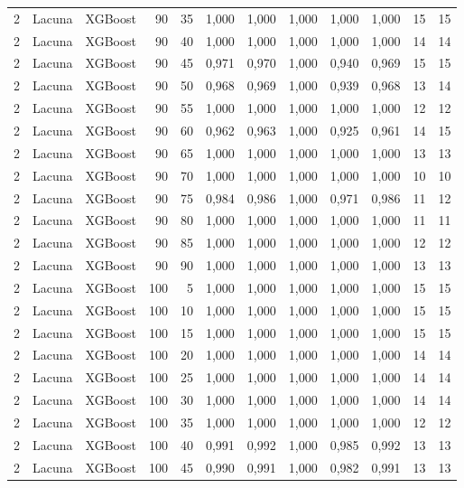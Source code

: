 \begin{longtable}{@{}rllrrrrrrrrr@{}}
2 & Lacuna & XGBoost & 90 & 35 & 1,000 & 1,000 & 1,000 & 1,000 & 1,000 & 15 & 15 \\
2 & Lacuna & XGBoost & 90 & 40 & 1,000 & 1,000 & 1,000 & 1,000 & 1,000 & 14 & 14 \\
2 & Lacuna & XGBoost & 90 & 45 & 0,971 & 0,970 & 1,000 & 0,940 & 0,969 & 15 & 15 \\
2 & Lacuna & XGBoost & 90 & 50 & 0,968 & 0,969 & 1,000 & 0,939 & 0,968 & 13 & 14 \\
2 & Lacuna & XGBoost & 90 & 55 & 1,000 & 1,000 & 1,000 & 1,000 & 1,000 & 12 & 12 \\
2 & Lacuna & XGBoost & 90 & 60 & 0,962 & 0,963 & 1,000 & 0,925 & 0,961 & 14 & 15 \\
2 & Lacuna & XGBoost & 90 & 65 & 1,000 & 1,000 & 1,000 & 1,000 & 1,000 & 13 & 13 \\
2 & Lacuna & XGBoost & 90 & 70 & 1,000 & 1,000 & 1,000 & 1,000 & 1,000 & 10 & 10 \\
2 & Lacuna & XGBoost & 90 & 75 & 0,984 & 0,986 & 1,000 & 0,971 & 0,986 & 11 & 12 \\
2 & Lacuna & XGBoost & 90 & 80 & 1,000 & 1,000 & 1,000 & 1,000 & 1,000 & 11 & 11 \\
2 & Lacuna & XGBoost & 90 & 85 & 1,000 & 1,000 & 1,000 & 1,000 & 1,000 & 12 & 12 \\
2 & Lacuna & XGBoost & 90 & 90 & 1,000 & 1,000 & 1,000 & 1,000 & 1,000 & 13 & 13 \\
2 & Lacuna & XGBoost & 100 & 5 & 1,000 & 1,000 & 1,000 & 1,000 & 1,000 & 15 & 15 \\
2 & Lacuna & XGBoost & 100 & 10 & 1,000 & 1,000 & 1,000 & 1,000 & 1,000 & 15 & 15 \\
2 & Lacuna & XGBoost & 100 & 15 & 1,000 & 1,000 & 1,000 & 1,000 & 1,000 & 15 & 15 \\
2 & Lacuna & XGBoost & 100 & 20 & 1,000 & 1,000 & 1,000 & 1,000 & 1,000 & 14 & 14 \\
2 & Lacuna & XGBoost & 100 & 25 & 1,000 & 1,000 & 1,000 & 1,000 & 1,000 & 14 & 14 \\
2 & Lacuna & XGBoost & 100 & 30 & 1,000 & 1,000 & 1,000 & 1,000 & 1,000 & 14 & 14 \\
2 & Lacuna & XGBoost & 100 & 35 & 1,000 & 1,000 & 1,000 & 1,000 & 1,000 & 12 & 12 \\
2 & Lacuna & XGBoost & 100 & 40 & 0,991 & 0,992 & 1,000 & 0,985 & 0,992 & 13 & 13 \\
2 & Lacuna & XGBoost & 100 & 45 & 0,990 & 0,991 & 1,000 & 0,982 & 0,991 & 13 & 13 \\

\end{longtable}
